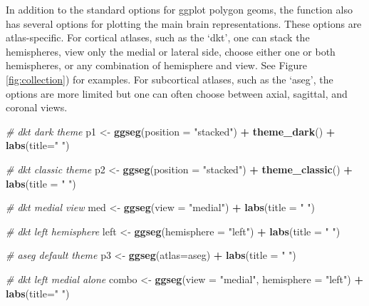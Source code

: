 \documentclass[fleqn,10pt]{wlpeerj} %
\newenvironment{Shaded}{\begin{snugshade}}{\end{snugshade}}
\newcommand{\CommentTok}[1]{\textcolor[rgb]{0.56,0.35,0.01}{\textit{#1}}}
\newcommand{\DataTypeTok}[1]{\textcolor[rgb]{0.13,0.29,0.53}{#1}}
\newcommand{\KeywordTok}[1]{\textcolor[rgb]{0.13,0.29,0.53}{\textbf{#1}}}
\newcommand{\NormalTok}[1]{#1}
\newcommand{\OperatorTok}[1]{\textcolor[rgb]{0.81,0.36,0.00}{\textbf{#1}}}
\newcommand{\StringTok}[1]{\textcolor[rgb]{0.31,0.60,0.02}{#1}}
\begin{document}
In addition to the standard options for ggplot polygon geoms, the function also has several options for plotting the main brain representations.
These options are atlas-specific.
For cortical atlases, such as the `dkt', one can stack the hemispheres, view only the medial or lateral side, choose either one or both hemispheres, or any combination of hemisphere and view.
See Figure \ref{fig:collection}) for examples.
For subcortical atlases, such as the `aseg', the options are more limited but one can often choose between axial, sagittal, and coronal views.

\begin{Shaded}
\begin{Highlighting}[]
\CommentTok{# dkt dark theme}
\NormalTok{p1 <-}\StringTok{ }\KeywordTok{ggseg}\NormalTok{(}\DataTypeTok{position =} \StringTok{"stacked"}\NormalTok{) }\OperatorTok{+}
\StringTok{  }\KeywordTok{theme_dark}\NormalTok{() }\OperatorTok{+}
\StringTok{  }\KeywordTok{labs}\NormalTok{(}\DataTypeTok{title=}\StringTok{" "}\NormalTok{)}

\CommentTok{# dkt classic theme}
\NormalTok{p2 <-}\StringTok{ }\KeywordTok{ggseg}\NormalTok{(}\DataTypeTok{position =} \StringTok{"stacked"}\NormalTok{) }\OperatorTok{+}
\StringTok{  }\KeywordTok{theme_classic}\NormalTok{() }\OperatorTok{+}
\StringTok{  }\KeywordTok{labs}\NormalTok{(}\DataTypeTok{title =} \StringTok{" "}\NormalTok{)}

\CommentTok{# dkt medial view}
\NormalTok{med <-}\StringTok{ }\KeywordTok{ggseg}\NormalTok{(}\DataTypeTok{view =} \StringTok{"medial"}\NormalTok{) }\OperatorTok{+}
\StringTok{  }\KeywordTok{labs}\NormalTok{(}\DataTypeTok{title =} \StringTok{" "}\NormalTok{)}

\CommentTok{# dkt left hemisphere}
\NormalTok{left <-}\StringTok{ }\KeywordTok{ggseg}\NormalTok{(}\DataTypeTok{hemisphere =} \StringTok{"left"}\NormalTok{) }\OperatorTok{+}
\StringTok{  }\KeywordTok{labs}\NormalTok{(}\DataTypeTok{title =} \StringTok{" "}\NormalTok{)}


\CommentTok{# aseg default theme}
\NormalTok{p3 <-}\StringTok{ }\KeywordTok{ggseg}\NormalTok{(}\DataTypeTok{atlas=}\NormalTok{aseg) }\OperatorTok{+}
\StringTok{  }\KeywordTok{labs}\NormalTok{(}\DataTypeTok{title =} \StringTok{" "}\NormalTok{)}


\CommentTok{# dkt left medial alone}
\NormalTok{combo <-}\StringTok{ }\KeywordTok{ggseg}\NormalTok{(}\DataTypeTok{view =} \StringTok{"medial"}\NormalTok{,}
      \DataTypeTok{hemisphere =} \StringTok{"left"}\NormalTok{) }\OperatorTok{+}
\StringTok{  }\KeywordTok{labs}\NormalTok{(}\DataTypeTok{title=}\StringTok{" "}\NormalTok{)}


\end{Highlighting}
\end{Shaded}
\end{document}
